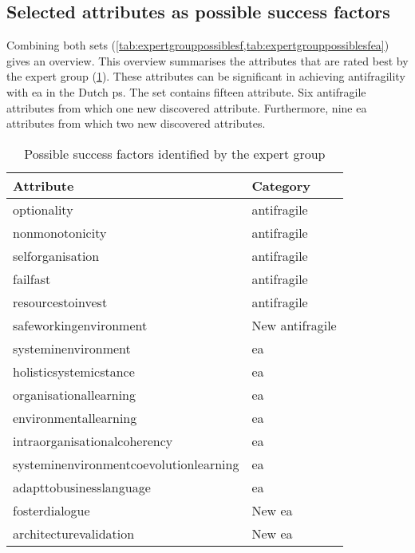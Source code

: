 \subsection{Selected attributes as possible success factors}
\label{sub:validationselectedattributesassf}
Combining both sets (\cref{tab:expertgrouppossiblesf,tab:expertgrouppossiblesfea}) gives an overview. This overview summarises the \glspl{attribute} that are rated best by the expert group (\cref{tab:expertgroupp2ossiblesf}). These \glspl{attribute} can be significant in achieving \gls{antifragility} with \acrlong{ea} in the Dutch \gls{ps}. The set contains fifteen \gls{attribute}. Six \gls{antifragile} \glspl{attribute} from which one new discovered \gls{attribute}. Furthermore, nine \acrlong{ea} \glspl{attribute} from which two new discovered \glspl{attribute}.
\begin{longtable}{@{}ll@{}}
	\toprule%
	\textbf{Attribute} & \textbf{Category}  \\%
	\midrule%
	\endhead%
	\hline
	\endfoot%
	\caption[Possible success factors identified by the expert group]{Possible success factors identified by the expert group}
	\label{tab:expertgroupp2ossiblesf}
	\endlastfoot%
	\Gls{optionality} & \Gls{antifragile} \\%
	\Gls{nonmonotonicity} & \Gls{antifragile} \\%
	\Gls{selforganisation} & \Gls{antifragile} \\%
	\Gls{failfast} & \Gls{antifragile} \\%
	\Gls{resourcestoinvest} & \Gls{antifragile} \\%
	\Gls{safeworkingenvironment} & New \Gls{antifragile} \\%
	\Gls{systeminenvironment} & \acrlong{ea} \\%
	\Gls{holisticsystemicstance} & \acrlong{ea} \\%
	\Gls{organisationallearning} & \acrlong{ea} \\%
	\Gls{environmentallearning} & \acrlong{ea} \\%
	\Gls{intraorganisationalcoherency} & \acrlong{ea} \\%
	\Gls{systeminenvironmentcoevolutionlearning} & \acrlong{ea} \\%
	\Gls{adapttobusinesslanguage} & \acrlong{ea} \\%
	\Gls{fosterdialogue} & New \acrlong{ea} \\%
	\Gls{architecturevalidation} & New \acrlong{ea} \\%
	\bottomrule%
\end{longtable}%